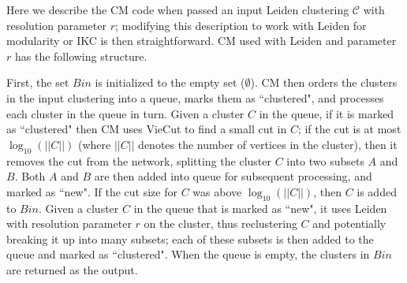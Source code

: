 \documentclass[12pt, oneside]{article}   	%
\begin{document}
Here we describe the CM code when passed an input  Leiden clustering $\mathcal{C}$  with resolution parameter $r$; modifying this description to work with 
Leiden for modularity or IKC is then straightforward.
CM used with Leiden and parameter $r$ has the following structure.


First, the set $Bin$ is initialized to the empty set  ($\emptyset$).
CM  then orders the clusters in the input clustering into a queue,  marks them as ``clustered", and processes each cluster in the queue in turn.
Given a cluster $C$ in the queue, if it is marked as ``clustered" then CM uses VieCut to find a small cut in $C$;  if the cut is at most $\log_{10}(||C||)$ (where $||C||$ denotes the number of 
vertices in the cluster), then it removes the cut from the network, splitting the cluster $C$ into two  subsets $A$ and $B$.
Both $A$ and $B$ are then added into  queue for subsequent processing, and marked as ``new". 
If the cut size for $C$ was above $\log_{10}(||C||)$, then $C$ is added to $Bin$.
Given a cluster $C$ in the queue that is marked as ``new", it uses Leiden with resolution parameter $r$ on the cluster, thus reclustering $C$
and potentially breaking it up into many subsets; each of these subsets is then added to the queue and marked as ``clustered".
When the queue is empty, the clusters in $Bin$ are returned as the output.
\end{document}
